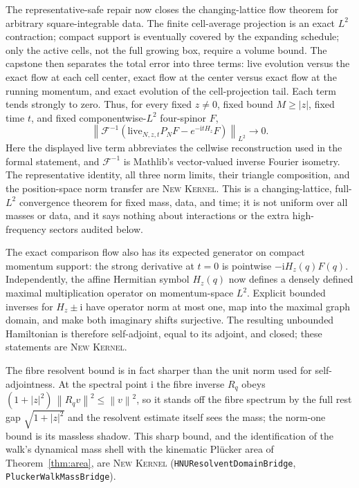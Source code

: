 \documentclass[11pt]{article}
\newcommand{\Kernel}{\textcolor{kernelcolor}{\textsc{Kernel}}}
\newcommand{\NewResult}{\textsc{New}}
\newcommand{\ii}{\mathrm{i}}
\newcommand{\norm}[1]{\left\lVert #1\right\rVert}
\begin{document}
  The representative-safe repair now closes the changing-lattice flow theorem
  for arbitrary square-integrable data.  The finite cell-average projection is
  an exact $L^2$ contraction; compact support is eventually covered by the
  expanding schedule; only the active cells, not the full growing box, require
  a volume bound.  The capstone then separates the total error into three
  terms: live evolution versus the exact flow at each cell center, exact flow
  at the center versus exact flow at the running momentum, and exact evolution
  of the cell-projection tail.  Each term tends strongly to zero.  Thus, for
  every fixed $z\neq0$, fixed bound $M\geq|z|$, fixed time $t$, and fixed
  componentwise-$L^2$ four-spinor $F$,
  \begin{equation}\label{eq:changinglatticepositionl2}
    \left\|\mathcal F^{-1}\!\left(
      \text{live}_{N,z,t}P_NF-e^{-\ii tH_z}F\right)\right\|_{L^2}
      \longrightarrow0.
  \end{equation}
  Here the displayed live term abbreviates the cellwise reconstruction used in
  the formal statement, and $\mathcal F^{-1}$ is Mathlib's vector-valued
  inverse Fourier isometry.  The representative identity, all three norm
  limits, their triangle composition, and the position-space norm transfer are
  \NewResult{} \Kernel{}.  This is a changing-lattice, full-$L^2$ convergence
  theorem for fixed mass, data, and time; it is not uniform over all masses or
  data, and it says nothing about interactions or the extra high-frequency
  sectors audited below.

  The exact comparison flow also has its expected generator on compact
  momentum support: the strong derivative at $t=0$ is pointwise
  $-\ii H_z(q)F(q)$.  Independently, the affine Hermitian symbol $H_z(q)$ now
  defines a densely defined maximal multiplication operator on momentum-space
  $L^2$.  Explicit bounded inverses for $H_z\pm\ii$ have operator norm at most
  one, map into the maximal graph domain, and make both imaginary shifts
  surjective.  The resulting unbounded Hamiltonian is therefore self-adjoint,
  equal to its adjoint, and closed; these statements are \NewResult{}
  \Kernel{}.

  The fibre resolvent bound is in fact sharper than the unit norm used for
  self-adjointness.  At the spectral point $\ii$ the fibre inverse $R_q$ obeys
  $(1+|z|^2)\,\norm{R_q v}^2\le\norm{v}^2$, so it stands off the fibre spectrum by
  the full rest gap $\sqrt{1+|z|^2}$ and the resolvent estimate itself sees the
  mass; the norm-one bound is its massless shadow.  This sharp bound, and the
  identification of the walk's dynamical mass shell with the kinematic Pl\"ucker
  area of Theorem~\ref{thm:area}, are \NewResult{} \Kernel{}
  (\texttt{HNUResolventDomainBridge}, \texttt{PluckerWalkMassBridge}).
\end{document}
